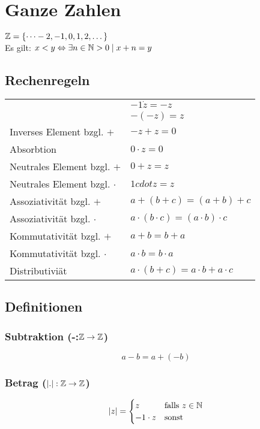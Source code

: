 \section{Ganze Zahlen}
$\mathbb{Z} = \{\cdots -2, -1, 0, 1, 2, \dots\}$\\
Es gilt: $x < y \Leftrightarrow \exists n \in \mathbb{N} > 0 \mid x + n = y$\\
\subsection{Rechenregeln}
\settowidth{\MyLenA}{Neutrales Element bzgl. $+$~~}
\begin{tabular}{@{}p{\the\MyLenA}%
		@{}p{}}
					& $-1 \dot z = -z$\\
					& $-(-z) = z$\\
	Inverses Element bzgl. $+$ & $-z + z = 0$\\
	Absorbtion	& $0 \cdot z = 0$\\
	Neutrales Element bzgl. $+$ & $0 + z = z$\\
	Neutrales Element bzgl. $\cdot$ & $1 cdot z = z$\\
	Assoziativität bzgl. $+$ & $a + (b + c) = (a + b) + c$\\
	Assoziativität bzgl. $\cdot$ & $a \cdot (b \cdot c) = (a \cdot b) \cdot c$\\
	Kommutativität bzgl. $+$ & $a + b = b + a$\\
	Kommutativität bzgl. $\cdot$ & $a \cdot b = b \cdot a$\\
	Distributiviät & $a  \cdot (b + c) = a \cdot b + a \cdot c$\\
\end{tabular}

\subsection{Definitionen}
\subsubsection{Subtraktion (-:$\mathbb{Z} \to \mathbb{Z}$)}
\begin{equation*}
	a - b = a + (- b)
\end{equation*}

\subsubsection{Betrag ($|.|: \mathbb{Z} \to \mathbb{Z}$)}
\begin{equation*}
	|z| = \begin{cases}
	      	z & \mbox{falls } z \in \mathbb{N}\\
			-1 \cdot z & \mbox{sonst}
	      \end{cases}
\end{equation*}

